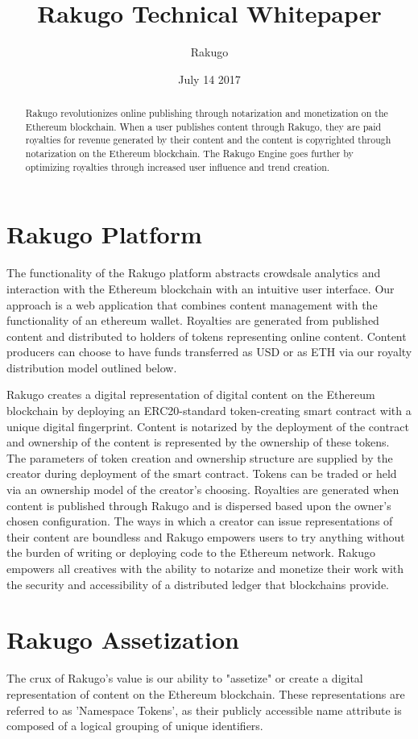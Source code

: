 \documentclass{article}
\title{Rakugo Technical Whitepaper}
\author{Rakugo}
\date{July 14 2017}
\begin{document}
\maketitle

\begin{abstract}
Rakugo revolutionizes online publishing through notarization and monetization on the Ethereum blockchain. When a user publishes content through Rakugo, they are paid royalties for revenue generated by their content and the content is copyrighted through notarization on the Ethereum blockchain. The Rakugo Engine goes further by optimizing royalties through increased user influence and trend creation.

\end{abstract}

\section{Rakugo Platform}
The functionality of the Rakugo platform abstracts crowdsale analytics and interaction with the Ethereum blockchain with an intuitive user interface. Our approach is a web application that combines content management with the functionality of an ethereum wallet. Royalties are generated from published content and distributed to holders of tokens representing online content. Content producers can choose to have funds transferred as USD or as ETH via our royalty distribution model outlined below.


Rakugo creates a digital representation of digital content on the Ethereum blockchain by deploying an ERC20-standard token-creating smart contract with a unique digital fingerprint. Content is notarized by the deployment of the contract and ownership of the content is represented by the ownership of these tokens. The parameters of token creation and ownership structure are supplied by the creator during deployment of the smart contract. Tokens can be traded or held via an ownership model of the creator's choosing. Royalties are generated when content is published through Rakugo and is dispersed based upon the owner's chosen configuration.
The ways in which a creator can issue representations of their content are boundless and Rakugo empowers users to try anything without the burden of writing or deploying code to the Ethereum network. 
Rakugo empowers all creatives with the ability to notarize and monetize their work with the security and accessibility of a distributed ledger that blockchains provide.


\section{Rakugo Assetization}
The crux of Rakugo’s value is our ability to "assetize" or create a digital representation of content on the Ethereum blockchain. These representations are referred to as 'Namespace Tokens', as their publicly accessible name attribute is composed of a logical grouping of unique identifiers.
\end{document}
